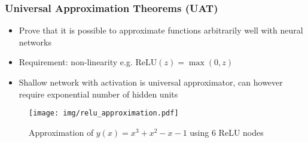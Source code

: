 \documentclass{beamer}
\newcommand{\relu}{\text{ReLU}}
\begin{document}
\begin{frame}
    \frametitle{Universal Approximation Theorems (UAT)}
    \begin{itemize}
        \item Prove that it is possible to approximate functions arbitrarily well with neural networks
        \item Requirement: non-linearity e.g. $\relu(z) = \max(0, z)$
        \item Shallow network with activation is universal approximator, can however require exponential number of hidden units %
    \end{itemize}    

    \begin{figure}
        \texttt{[image: img/relu\_approximation.pdf]}
        \caption{Approximation of $y(x) = x^3+x^2-x-1$ using 6 ReLU nodes}
    \end{figure}


\end{frame}
\end{document}
